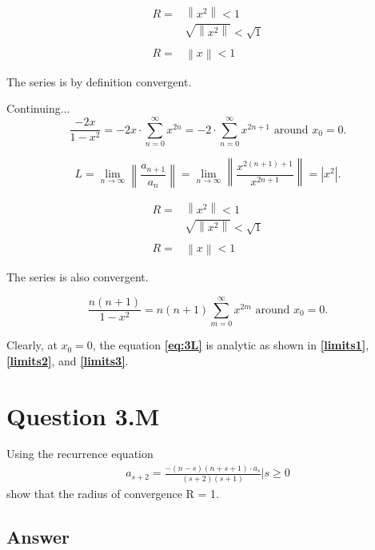 \documentclass{article}
\begin{document}
\begin{align*}
R =& \left\|x^2\right\| < 1 \\
& \sqrt{\left\|x^2\right\|} < \sqrt{1}\\
\\
R =& \left\|x\right\| < 1
\end{align*}

The series is by definition convergent.

Continuing...
\begin{equation*}
\frac{-2x}{1-x^2} = -2x\cdot \sum_{n=0}^{\infty} {x^{2n}} = -2\cdot \sum_{n=0}^{\infty} {x^{2n+1}} \text{  around } x_0=0.
\end{equation*}

\begin{equation}\label{limits2}
L = \lim_{n\to\infty} \left\| \frac{a_{n+1}}{a_n} \right\| = \lim_{n\to\infty}\left\|\frac{x^{2(n+1)+1}}{x^{2n+1}}\right\| = \left|x^2\right|.
\end{equation}
    
\begin{align*}
R =& \left\|x^2\right\| < 1 \\
& \sqrt{\left\|x^2\right\|} < \sqrt{1}\\
\\
R =& \left\|x\right\| < 1
\end{align*}

The series is also convergent.

\begin{equation}\label{limits3}
\frac{n(n+1)}{1-x^2} = n(n+1) \sum_{m=0}^{\infty} x^{2m} \text{  around } x_0=0.
\end{equation}

Clearly, at $x_0 = 0$, the equation \textbf{\ref{eq:3L}} is analytic as shown in \textbf{\ref{limits1}}, \textbf{\ref{limits2}}, and \textbf{\ref{limits3}}.

\section*{Question 3.M}
Using the recurrence equation
\begin{align}\label{3M}
a_{s+2} = \frac{-(n-s)(n+s+1)\cdot{a_s}}{(s+2)(s+1)}\Bigr|
s\geq0
\end{align}
show that the radius of convergence R = 1.

\subsection*{Answer}
\end{document}
